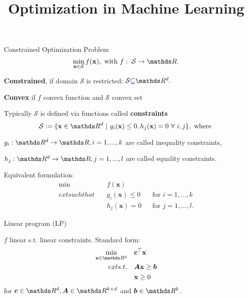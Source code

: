 \documentclass[11pt,compress,t,notes=noshow, xcolor=table]{beamer}
\title{Optimization in Machine Learning}
\begin{document}

\begin{frame2}{Constrained Optimization Problem}
$$
\min_{\xv \in \mathcal{S}} \fx, \text{ with } f: \; \mathcal{S} \to \R.
$$

\begin{itemizeL}
\item \textbf{Constrained}, if domain $\mathcal{S}$ is restricted: $\mathcal{S} \textcolor{blue}{\subsetneq} \R^d.$
\item \textbf{Convex} if $f$ convex function and $\mathcal{S}$ convex set
\item Typically $\mathcal{S}$ is defined via functions called \textbf{constraints}
$$
\mathcal{S}:= \{\xv \in \R^d ~|~ g_i(\xv) \le 0, h_j(\xv) = 0 ~\forall~ i, j\}, \text{ where }
$$
\begin{itemizeS}
\item $g_i: \R^d \to \R, i = 1, ..., k$ are called inequality constraints,
\item $h_j: \R^d \to \R, j = 1, ..., l$ are called equality constraints.
\end{itemizeS}
\end{itemizeL}

\spacer

Equivalent formulation:
$$
\begin{aligned}
\min \quad & f(\mathbf{x})  \\
ext{such that} \quad & g_i(\mathbf{x}) \le 0 && \text{for } i=1,\ldots,k \\
& h_j(\mathbf{x}) = 0 && \text{for } j=1,\ldots,l.
\end{aligned}
$$
\end{frame2}


\begin{framei}{Linear program (LP)}
\item $f$ linear s.t. linear constraints. Standard form:
$$
\begin{aligned}
\min_{\xv \in \R^d} \quad & \bm{c}^\top \xv \\
ext{s.t. } \quad & \bm{A}\xv \ge \bm{b} \\
& \xv \ge 0
\end{aligned}
$$
for $\bm{c}\in \R^d, \bm{A} \in \R^{k \times d}$ and $\bm{b} \in \R^k$.

\vfill

\end{framei}
\end{document}

